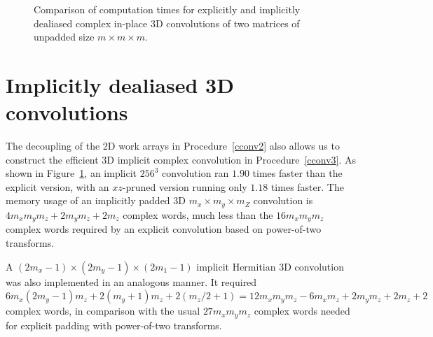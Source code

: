 \documentclass[final]{siamltex}
\begin{document}
\begin{figure}[htbp]
\begin{minipage}{0.5\linewidth}
\begin{center}
\caption{Comparison of computation times for explicitly and implicitly
dealiased complex in-place 3D convolutions of two matrices of
unpadded size $m\times m\times m$.}
\label{timing3c}
\end{center}
\end{minipage}
%
\end{figure}


\section{Implicitly dealiased 3D convolutions}\label{3d}

The decoupling of the 2D work arrays in Procedure~\ref{cconv2}
also allows us to construct the efficient 3D implicit complex convolution
in Procedure~\ref{cconv3}. As shown in Figure~\ref{timing3c}, an implicit
$256^3$ convolution ran $1.90$ times faster than the explicit version, with
an $xz$-pruned version running only $1.18$ times faster. The memory usage of an
implicitly padded 3D $m_x\times m_y\times m_Z$ convolution is
$4m_xm_ym_z+2m_y m_z+2m_z$ complex words, much less than the
$16m_xm_ym_z$ complex words required by an explicit 
convolution based on power-of-two transforms.

A $(2m_x-1)\times (2m_y-1)\times (2m_1-1)$ implicit Hermitian 3D
convolution was also implemented in an analogous manner. It required
$6m_x(2m_y-1)m_z+2(m_y+1)m_z+2(m_z/2+1)=12m_xm_ym_z-6m_xm_z+2m_ym_z+2m_z+2$
complex words, in comparison with the usual $27m_xm_ym_z$ complex words
needed for explicit padding with power-of-two transforms.

\begin{function}[htbp]
  \Return \xf\;
\caption{cconv3(matrix~{\sf f}, matrix~{\sf g}) 
returns an in-place implicitly dealiased convolution of
$m_x\times m_y\times m_z$ matrices {\sf f} and {\sf g} using temporary
$m_x\times m_y\times m_z$ matrices ${\sf U}$ and ${\sf V}$, 
$m_y\times m_z$ matrices ${\sf u}_2$ and ${\sf v}_2$,
and vectors ${\sf u}_1$ and ${\sf v}_1$ of length~$m_z$.}\label{cconv3}
\end{function}
\end{document}
